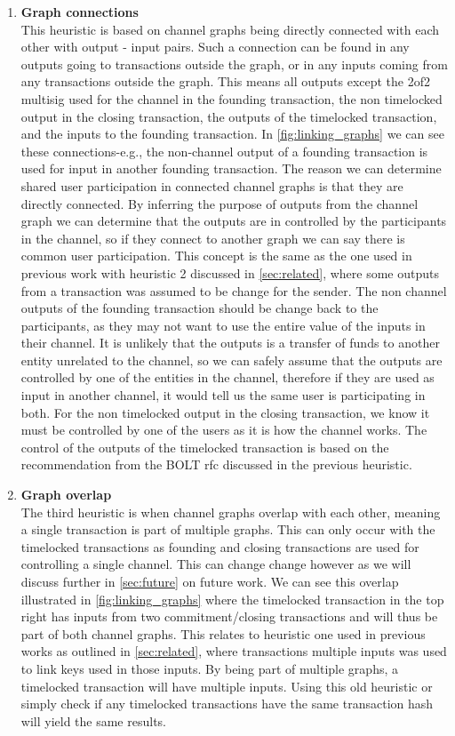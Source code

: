\begin{enumerate}
    \item \textbf{Graph connections}\\
This heuristic is based on channel graphs being directly connected with each other with output - input pairs. Such a connection can be found in any outputs going to transactions outside the graph, or in any inputs coming from any transactions outside the graph. This means all outputs except the 2of2 multisig used for the channel in the founding transaction, the non timelocked output in the closing transaction, the outputs of the timelocked transaction, and the inputs to the founding transaction. 
In \cref{fig:linking_graphs} we can see these connections-e.g., the non-channel output of a founding transaction is used for input in another founding transaction. The reason we can determine shared user participation in connected channel graphs is that they are directly connected.
By inferring the purpose of outputs from the channel graph we can determine that the outputs are in controlled by the participants in the channel, so if they connect to another graph we can say there is common user participation.
This concept is the same as the one used in previous work with heuristic 2 discussed in \cref{sec:related}, where some outputs from a transaction was assumed to be change for the sender. The non channel outputs of the founding transaction should be change back to the participants, as they may not want to use the entire value of the inputs in their channel. It is unlikely that the outputs is a transfer of funds to another entity unrelated to the channel, so we can safely assume that the outputs are controlled by one of the entities in the channel, therefore if they are used as input in another channel, it would tell us the same user is participating in both. For the non timelocked output in the closing transaction, we know it must be controlled by one of the users as it is how the channel works. The control of the outputs of the timelocked transaction is based on the recommendation from the BOLT rfc \cite{bolt7} discussed in the previous heuristic. 

    \item \textbf{Graph overlap}\\
The third heuristic is when channel graphs overlap with each other, meaning a single transaction is part of multiple graphs. This can only occur with the timelocked transactions as founding and closing transactions are used for controlling a single channel. This can change change however as we will discuss further in \cref{sec:future} on future work. We can see this overlap illustrated in \cref{fig:linking_graphs} where the timelocked transaction in the top right has inputs from two commitment/closing transactions and will thus be part of both channel graphs. This relates to heuristic one used in previous works as outlined in \cref{sec:related}, where transactions multiple inputs was used to link keys used in those inputs. By being part of multiple graphs, a timelocked transaction will have multiple inputs. Using this old heuristic or simply check if any timelocked transactions have the same transaction hash will yield the same results.
    
    
\end{enumerate}

